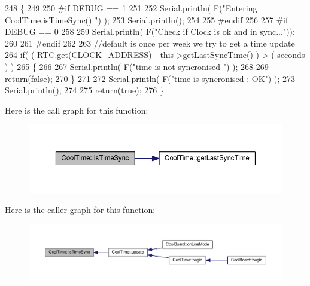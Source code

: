 \begin{DoxyCode}
248 \{
249 
250 \textcolor{preprocessor}{#if DEBUG == 1}
251 
252     Serial.println( F(\textcolor{stringliteral}{"Entering CoolTime.isTimeSync() "}) );
253     Serial.println();
254 
255 \textcolor{preprocessor}{#endif }
256 
257 \textcolor{preprocessor}{#if DEBUG == 0}
258 
259     Serial.println( F(\textcolor{stringliteral}{"Check if Clock is ok and in sync..."}));
260 
261 \textcolor{preprocessor}{#endif}
262 
263     \textcolor{comment}{//default is once per week we try to get a time update}
264     \textcolor{keywordflow}{if}( ( RTC.get(CLOCK\_ADDRESS) - this->\hyperlink{class_cool_time_a5d17f707a9d337720493b2bce9d41c21}{getLastSyncTime}() ) > ( seconds ) ) 
265     \{
266 
267         Serial.println( F(\textcolor{stringliteral}{"time is not syncronised "}) );
268     
269         \textcolor{keywordflow}{return}(\textcolor{keyword}{false});  
270     \}
271     
272     Serial.println( F(\textcolor{stringliteral}{"time is syncronised : OK"}) );
273     Serial.println();
274 
275     \textcolor{keywordflow}{return}(\textcolor{keyword}{true});
276 \}
\end{DoxyCode}
Here is the call graph for this function\+:\nopagebreak
\begin{figure}[H]
\begin{center}
\leavevmode
\includegraphics[width=350pt]{d6/d49/class_cool_time_a5ae038a4498602b189f76a10bf02adf8_cgraph}
\end{center}
\end{figure}
Here is the caller graph for this function\+:\nopagebreak
\begin{figure}[H]
\begin{center}
\leavevmode
\includegraphics[width=350pt]{d6/d49/class_cool_time_a5ae038a4498602b189f76a10bf02adf8_icgraph}
\end{center}
\end{figure}
\mbox{\label{class_cool_time_af355e7f9b3898211cd2ff25eab5933b1}} 
